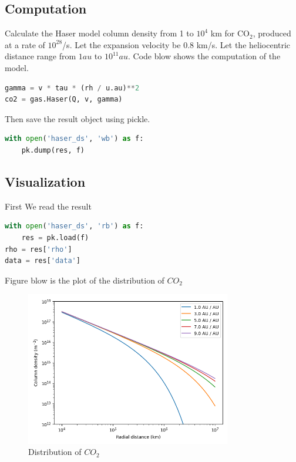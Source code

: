 \documentclass{report}
\begin{document}
\subsection{Computation}
Calculate the Haser model column density from 1 to $10^4$ km for CO$_2$, produced at a rate of $10^{28}$/s. Let the expansion velocity be 0.8 km/s.
Let the heliocentric distance range from $1au$ to $10^{11}au$.
Code blow shows the computation of the model.
\begin{lstlisting}[language=Python]
gamma = v * tau * (rh / u.au)**2
co2 = gas.Haser(Q, v, gamma)
\end{lstlisting}

Then save the result object using pickle.
\begin{lstlisting}[language=Python]
with open('haser_ds', 'wb') as f:
    pk.dump(res, f)
\end{lstlisting}

\subsection{Visualization}
First We read the result
\begin{lstlisting}[language=Python]
with open('haser_ds', 'rb') as f:
    res = pk.load(f)
rho = res['rho']
data = res['data']
\end{lstlisting}

Figure blow is the plot of the distribution of $CO_2$
\begin{figure}[htb]
    \centering
    \includegraphics[width=0.8\textwidth]{haser}
    \caption{Distribution of $CO_2$}
    \label{fig:haser}
\end{figure}

\end{document}
